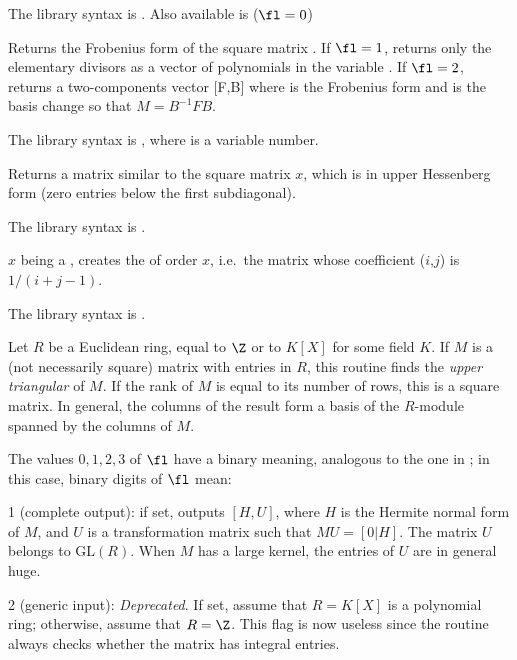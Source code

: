 The library syntax is .
Also available is  ($\fl = 0$)

\label{se:matfrobenius}
Returns the Frobenius form of
the square matrix . If $\fl=1$, returns only the elementary divisors as
a vector of polynomials in the variable .  If $\fl=2$, returns a
two-components vector [F,B] where  is the Frobenius form and  is
the basis change so that $M=B^{-1}FB$.

The library syntax is , where  is a variable number.

\label{se:mathess}
Returns a matrix similar to the square matrix $x$, which is in upper Hessenberg
form (zero entries below the first subdiagonal).

The library syntax is .

\label{se:mathilbert}
$x$ being a , creates the
of order $x$, i.e.~the matrix whose coefficient
($i$,$j$) is $1/ (i+j-1)$.

The library syntax is .

\label{se:mathnf}
Let $R$ be a Euclidean ring, equal to $\Z$ or to $K[X]$ for some field
$K$. If $M$ is a (not necessarily square) matrix with entries in $R$, this
routine finds the \emph{upper triangular}  of $M$.
If the rank of $M$ is equal to its number of rows, this is a square
matrix. In general, the columns of the result form a basis of the $R$-module
spanned by the columns of $M$.

The values $0,1,2,3$ of $\fl$ have a binary meaning, analogous to the one
in ; in this case, binary digits of $\fl$ mean:

\item 1 (complete output): if set, outputs $[H,U]$, where $H$ is the Hermite
normal form of $M$, and $U$ is a transformation matrix such that $MU=[0|H]$.
The matrix $U$ belongs to $\text{GL}(R)$. When $M$ has a large kernel, the
entries of $U$ are in general huge.

\item 2 (generic input): \emph{Deprecated}. If set, assume that $R = K[X]$ is
a polynomial ring; otherwise, assume that $R = \Z$. This flag is now useless
since the routine always checks whether the matrix has integral entries.

